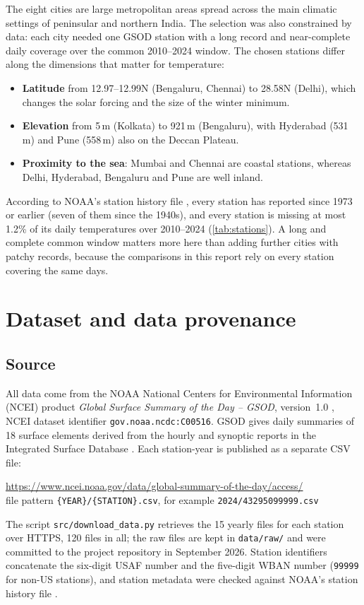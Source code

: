 \documentclass[11pt,a4paper]{article}
\newcommand{\code}[1]{\texttt{#1}}
\begin{document}
The eight cities are large metropolitan areas spread across the main climatic settings of peninsular and northern India. The selection was also constrained by data: each city needed one GSOD station with a long record and near-complete daily coverage over the common 2010--2024 window. The chosen stations differ along the dimensions that matter for temperature:
\begin{itemize}
  \item \textbf{Latitude} from 12.97--12.99\textdegree N (Bengaluru, Chennai) to 28.58\textdegree N (Delhi), which changes the solar forcing and the size of the winter minimum.
  \item \textbf{Elevation} from 5\,m (Kolkata) to 921\,m (Bengaluru), with Hyderabad (531\,m) and Pune (558\,m) also on the Deccan Plateau.
  \item \textbf{Proximity to the sea}: Mumbai and Chennai are coastal stations, whereas Delhi, Hyderabad, Bengaluru and Pune are well inland.
\end{itemize}
According to NOAA's station history file \citep{ncei_isd_history}, every station has reported since 1973 or earlier (seven of them since the 1940s), and every station is missing at most 1.2\% of its daily temperatures over 2010--2024 (\cref{tab:stations}). A long and complete common window matters more here than adding further cities with patchy records, because the comparisons in this report rely on every station covering the same days.

\section{Dataset and data provenance}
\label{sec:data}

\subsection{Source}

All data come from the NOAA National Centers for Environmental Information (NCEI) product \emph{Global Surface Summary of the Day -- GSOD}, version~1.0 \citep{ncei_gsod}, NCEI dataset identifier \nolinkurl{gov.noaa.ncdc:C00516}. GSOD gives daily summaries of 18 surface elements derived from the hourly and synoptic reports in the Integrated Surface Database \citep{ncei_gsod_readme}. Each station-year is published as a separate CSV file:
\begin{center}
\small\url{https://www.ncei.noaa.gov/data/global-summary-of-the-day/access/}\\[2pt]
file pattern \code{\{YEAR\}/\{STATION\}.csv}, for example \code{2024/43295099999.csv}
\end{center}
The script \code{src/download\_data.py} retrieves the 15 yearly files for each station over HTTPS, 120 files in all; the raw files are kept in \code{data/raw/} and were committed to the project repository in September 2026. Station identifiers concatenate the six-digit USAF number and the five-digit WBAN number (\code{99999} for non-US stations), and station metadata were checked against NOAA's station history file \citep{ncei_isd_history}.
\end{document}
